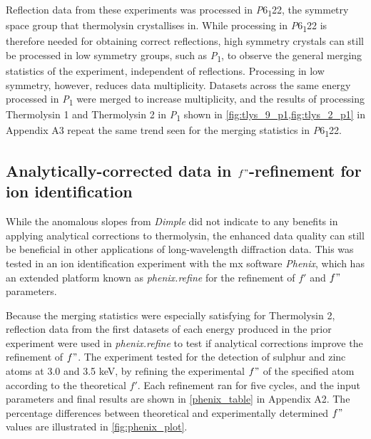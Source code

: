 Reflection data from these experiments was processed in \textit{P}6\textsubscript{1}22, the symmetry space group that thermolysin crystallises in. While processing in \textit{P}6\textsubscript{1}22 is therefore needed for obtaining correct reflections, high symmetry crystals can still be processed in low symmetry groups, such as \textit{P}\textsubscript{1}, to observe the general merging statistics of the experiment, independent of reflections.
Processing in low symmetry, however, reduces data multiplicity. Datasets across the same energy processed in \textit{P}\textsubscript{1} were merged to increase multiplicity, and the results of processing Thermolysin 1 and Thermolysin 2 in \textit{P}\textsubscript{1} shown in \cref{fig:tlys_9_p1,fig:tlys_2_p1} in Appendix A3 repeat the same trend seen for the merging statistics in \textit{P}6\textsubscript{1}22.

\subsection{Analytically-corrected data in $f"$-refinement for ion identification}


While the anomalous slopes from \textit{Dimple} did not indicate to any benefits in applying analytical corrections to thermolysin, the enhanced data quality can still be beneficial in other applications of long-wavelength diffraction data. This was tested in an ion identification experiment with the \ac{mx} software \textit{Phenix}, which has an extended platform known as \textit{phenix.refine} for the refinement of $f'$ and $f"$ parameters.

Because the merging statistics were especially satisfying for Thermolysin 2, reflection data from the first datasets of each energy produced 
in the prior experiment were used in \textit{phenix.refine} to test if analytical corrections improve the refinement of $f"$. The experiment tested for the detection of sulphur and zinc atoms at 3.0 and 3.5 \unit{keV}, by refining the experimental $f"$ of the specified atom according to the theoretical $f'$. Each refinement ran for five cycles, and the input parameters and final results are shown in \cref{phenix_table} in Appendix A2. The percentage differences between theoretical and experimentally determined $f"$ values are illustrated in \cref{fig:phenix_plot}.%

